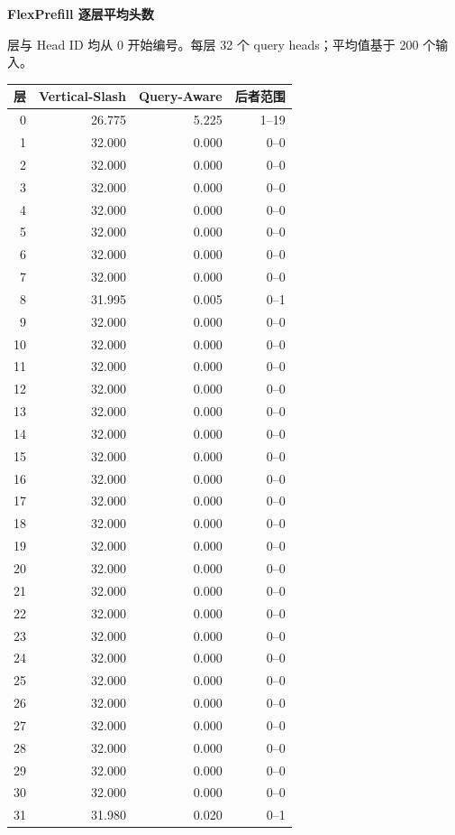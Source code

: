 \documentclass[11pt,a4paper]{article}
\newcommand{\zh}[1]{{\CJKfont #1}}
\renewcommand{\arraystretch}{1.12}
\begin{document}
\newpage
\begin{center}
  {\Large\bfseries FlexPrefill \zh{逐层平均头数}}
\end{center}
\zh{层与} Head ID \zh{均从} 0 \zh{开始编号。每层} 32 \zh{个} query heads\zh{；平均值基于} 200 \zh{个输入。}

\begin{center}
\renewcommand{\arraystretch}{1.02}
\begin{tabular}{@{}rrrr@{}}
\toprule
\textbf{\zh{层}} & \textbf{Vertical-Slash} & \textbf{Query-Aware} & \textbf{\zh{后者范围}} \\
\midrule
0 & 26.775 & 5.225 & 1--19 \\
1 & 32.000 & 0.000 & 0--0 \\
2 & 32.000 & 0.000 & 0--0 \\
3 & 32.000 & 0.000 & 0--0 \\
4 & 32.000 & 0.000 & 0--0 \\
5 & 32.000 & 0.000 & 0--0 \\
6 & 32.000 & 0.000 & 0--0 \\
7 & 32.000 & 0.000 & 0--0 \\
8 & 31.995 & 0.005 & 0--1 \\
9 & 32.000 & 0.000 & 0--0 \\
10 & 32.000 & 0.000 & 0--0 \\
11 & 32.000 & 0.000 & 0--0 \\
12 & 32.000 & 0.000 & 0--0 \\
13 & 32.000 & 0.000 & 0--0 \\
14 & 32.000 & 0.000 & 0--0 \\
15 & 32.000 & 0.000 & 0--0 \\
16 & 32.000 & 0.000 & 0--0 \\
17 & 32.000 & 0.000 & 0--0 \\
18 & 32.000 & 0.000 & 0--0 \\
19 & 32.000 & 0.000 & 0--0 \\
20 & 32.000 & 0.000 & 0--0 \\
21 & 32.000 & 0.000 & 0--0 \\
22 & 32.000 & 0.000 & 0--0 \\
23 & 32.000 & 0.000 & 0--0 \\
24 & 32.000 & 0.000 & 0--0 \\
25 & 32.000 & 0.000 & 0--0 \\
26 & 32.000 & 0.000 & 0--0 \\
27 & 32.000 & 0.000 & 0--0 \\
28 & 32.000 & 0.000 & 0--0 \\
29 & 32.000 & 0.000 & 0--0 \\
30 & 32.000 & 0.000 & 0--0 \\
31 & 31.980 & 0.020 & 0--1 \\
\bottomrule
\end{tabular}
\end{center}
\end{document}
